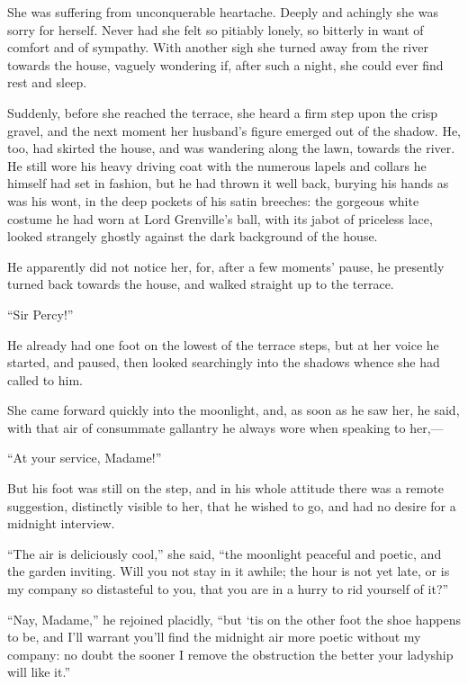 \documentclass[paper=5.5in:8.5in,BCOR=7mm,twoside,DIV=calc,12pt,usegeometry,chapterprefix,endperiod,headings=big]{scrbook}
\begin{document}
She was suffering from unconquerable heartache. Deeply and achingly she was sorry for herself. Never had she felt so pitiably lonely, so bitterly in want of comfort and of sympathy. With another sigh she turned away from the river towards the house, vaguely wondering if, after such a night, she could ever find rest and sleep.

Suddenly, before she reached the terrace, she heard a firm step upon the crisp gravel, and the next moment her husband's figure emerged out of the shadow. He, too, had skirted the house, and was wandering along the lawn, towards the river. He still wore his heavy driving coat with the numerous lapels and collars he himself had set in fashion, but he had thrown it well back, burying his hands as was his wont, in the deep pockets of his satin breeches: the gorgeous white costume he had worn at Lord Grenville's ball, with its jabot of priceless lace, looked strangely ghostly against the dark background of the house.

He apparently did not notice her, for, after a few moments’ pause, he presently turned back towards the house, and walked straight up to the terrace.

\enquote{Sir Percy!}

He already had one foot on the lowest of the terrace steps, but at her voice he started, and paused, then looked searchingly into the shadows whence she had called to him.

She came forward quickly into the moonlight, and, as soon as he saw her, he said, with that air of consummate gallantry he always wore when speaking to her,---

\enquote{At your service, Madame!}

But his foot was still on the step, and in his whole attitude there was a remote suggestion, distinctly visible to her, that he wished to go, and had no desire for a midnight interview.

\enquote{The air is deliciously cool,} she said, \enquote{the moonlight peaceful and poetic, and the garden inviting. Will you not stay in it awhile; the hour is not yet late, or is my company so distasteful to you, that you are in a hurry to rid yourself of it?}

\enquote{Nay, Madame,} he rejoined placidly, \enquote{but `tis on the other foot the shoe happens to be, and I'll warrant you'll find the midnight air more poetic without my company: no doubt the sooner I remove the obstruction the better your ladyship will like it.}
\end{document}
